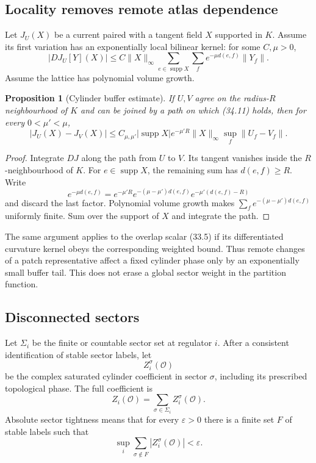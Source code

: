 \documentclass[11pt]{article}
\newtheorem{proposition}[theorem]{Proposition}
\begin{document}
\subsection{Locality removes remote atlas dependence}

Let \(J_U(X)\) be a current paired with a tangent field \(X\) supported
in \(K\).  Assume its first variation has an exponentially local
bilinear kernel: for some \(C,\mu>0\),
\[
 |D J_U[Y](X)|
 \leq
 C\|X\|_\infty
 \sum_{e\in\operatorname{supp}X}
 \sum_{f}
 e^{-\mu d(e,f)}\|Y_f\|.
 \tag{34.11}
\]
Assume the lattice has polynomial volume growth.

\begin{proposition}[Cylinder buffer estimate]
\label{prop:v11v34-buffer}
If \(U,V\) agree on the radius-\(R\) neighbourhood of \(K\) and can be
joined by a path on which (34.11) holds, then for every
\(0<\mu'<\mu\),
\[
 |J_U(X)-J_V(X)|
 \leq
 C_{\mu,\mu'}|\operatorname{supp}X|
 e^{-\mu'R}\|X\|_\infty
 \sup_f\|U_f-V_f\|.
 \tag{34.12}
\]
\end{proposition}

\begin{proof}
Integrate \(DJ\) along the path from \(U\) to \(V\).  Its tangent
vanishes inside the \(R\)-neighbourhood of \(K\).  For
\(e\in\operatorname{supp}X\), the remaining sum has \(d(e,f)\geq R\).
Write
\[
 e^{-\mu d(e,f)}
 =
 e^{-\mu'R}e^{-(\mu-\mu')d(e,f)}
 e^{-\mu'(d(e,f)-R)}
\]
and discard the last factor.  Polynomial volume growth makes
\(\sum_f e^{-(\mu-\mu')d(e,f)}\) uniformly finite.  Sum over the support
of \(X\) and integrate the path.
\end{proof}

The same argument applies to the overlap scalar (33.5) if its
differentiated curvature kernel obeys the corresponding weighted bound.
Thus remote changes of a patch representative affect a fixed cylinder
phase only by an exponentially small buffer tail.  This does not erase
a global sector weight in the partition function.

\subsection{Disconnected sectors}

Let \(\Sigma_i\) be the finite or countable sector set at regulator
\(i\).  After a consistent identification of stable sector labels, let
\[
 Z_i^\sigma(\mathcal O)
 \tag{34.13}
\]
be the complex saturated cylinder coefficient in sector \(\sigma\),
including its prescribed topological phase.  The full coefficient is
\[
 Z_i(\mathcal O)=\sum_{\sigma\in\Sigma_i}
 Z_i^\sigma(\mathcal O).
 \tag{34.14}
\]
Absolute sector tightness means that for every \(\varepsilon>0\) there
is a finite set \(F\) of stable labels such that
\[
 \sup_i\sum_{\sigma\notin F}
 |Z_i^\sigma(\mathcal O)|<\varepsilon.
 \tag{34.15}
\]
\end{document}

